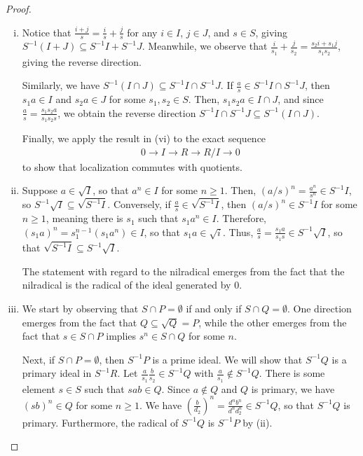 \documentclass[10pt]{mypackage}
\begin{document}
\begin{proof}\hfill
  \begin{enumerate}[(i)]
    \item Notice that $\frac{i + j}{s} = \frac{i}{s} + \frac{j}{s}$ for any $i\in I$, $j\in J$, and $s\in S$, giving $S^{-1}\left( I + J \right)\subseteq S^{-1}I + S^{-1}J$. Meanwhile, we observe that $\frac{i}{s_1} + \frac{j}{s_2} = \frac{s_2i + s_1j}{s_1s_2}$, giving the reverse direction.

      Similarly, we have $S^{-1}\left( I\cap J \right)\subseteq S^{-1}I\cap S^{-1}J$. If $\frac{a}{s}\in S^{-1}I\cap S^{-1}J$, then $s_1a\in I$ and $s_2a\in J$ for some $s_1,s_2\in S$. Then, $s_1s_2a\in I\cap J$, and since $\frac{a}{s} = \frac{s_1s_2a}{s_1s_2s}$, we obtain the reverse direction $S^{-1}I\cap S^{-1}J\subseteq S^{-1}\left( I\cap J \right)$.

      Finally, we apply the result in (vi) to the exact sequence
      \begin{align*}
        0\rightarrow I\rightarrow R\rightarrow R/I\rightarrow 0
      \end{align*}
      to show that localization commutes with quotients.
    \item Suppose $a\in \sqrt{I}$, so that $a^{n}\in I$ for some $n\geq 1$. Then, $\left( a/s \right)^{n} = \frac{a^{n}}{s^{n}}\in S^{-1}I$, so $S^{-1}\sqrt{I}\subseteq \sqrt{S^{-1}I}$. Conversely, if $\frac{a}{s}\in \sqrt{S^{-1}I}$, then $\left( a/s \right)^{n}\in S^{-1}I$ for some $n\geq 1$, meaning there is $s_1$ such that $s_1a^{n}\in I$. Therefore, $\left( s_1a \right)^{n} = s_1^{n-1}\left( s_1a^{n} \right)\in I$, so that $s_1a\in \sqrt{i}$. Thus, $\frac{a}{s} = \frac{s_1a}{s_1s}\in S^{-1}\sqrt{I}$, so that $\sqrt{S^{-1}I}\subseteq S^{-1}\sqrt{I}$.

      The statement with regard to the nilradical emerges from the fact that the nilradical is the radical of the ideal generated by $0$.
    \item We start by observing that $S\cap P = \emptyset$ if and only if $S\cap Q = \emptyset$. One direction emerges from the fact that $Q\subseteq \sqrt{Q} = P$, while the other emerges from the fact that $s\in S\cap P$ implies $s^{n}\in S\cap Q$ for some $n$.

      Next, if $S\cap P = \emptyset$, then $S^{-1}P$ is a prime ideal. We will show that $S^{-1}Q$ is a primary ideal in $S^{-1}R$. Let $\frac{a}{s_1}\frac{b}{s_2}\in S^{-1}Q$ with $\frac{a}{s_1}\notin S^{-1}Q$. There is some element $s\in S$ such that $sab\in Q$. Since $a\notin Q$ and $Q$ is primary, we have $\left( sb \right)^{n}\in Q$ for some $n\geq 1$. We have $\left( \frac{b}{d_2} \right)^{n} = \frac{d^nb^n}{d^nd_2^n}\in S^{-1}Q$, so that $S^{-1}Q$ is primary. Furthermore, the radical of $S^{-1}Q$ is $S^{-1}P$ by (ii).


\end{enumerate}
\end{proof}
\end{document}
